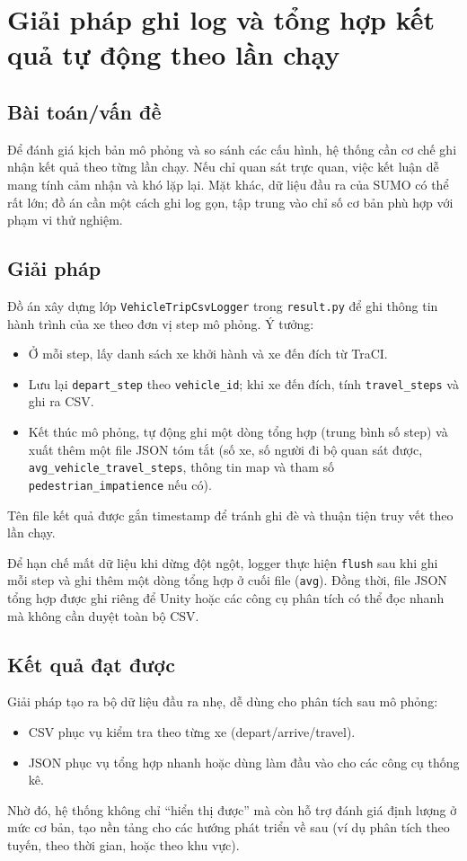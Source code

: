 \documentclass[../DoAn.tex]{subfiles}
\begin{document}
\section{Giải pháp ghi log và tổng hợp kết quả tự động theo lần chạy}
\subsection{Bài toán/vấn đề}
Để đánh giá kịch bản mô phỏng và so sánh các cấu hình, hệ thống cần cơ chế ghi nhận kết quả theo từng lần chạy. Nếu chỉ quan sát trực quan, việc kết luận dễ mang tính cảm nhận và khó lặp lại. Mặt khác, dữ liệu đầu ra của SUMO có thể rất lớn; đồ án cần một cách ghi log gọn, tập trung vào chỉ số cơ bản phù hợp với phạm vi thử nghiệm.

\subsection{Giải pháp}
Đồ án xây dựng lớp \texttt{VehicleTripCsvLogger} trong \texttt{result.py} để ghi thông tin hành trình của xe theo đơn vị step mô phỏng. Ý tưởng:
\begin{itemize}[leftmargin=2em]
	\item Ở mỗi step, lấy danh sách xe khởi hành và xe đến đích từ TraCI.
	\item Lưu lại \texttt{depart\_step} theo \texttt{vehicle\_id}; khi xe đến đích, tính \texttt{travel\_steps} và ghi ra CSV.
	\item Kết thúc mô phỏng, tự động ghi một dòng tổng hợp (trung bình số step) và xuất thêm một file JSON tóm tắt (số xe, số người đi bộ quan sát được, \texttt{avg\_vehicle\_travel\_steps}, thông tin map và tham số \texttt{pedestrian\_impatience} nếu có).
\end{itemize}
Tên file kết quả được gắn timestamp để tránh ghi đè và thuận tiện truy vết theo lần chạy.

Để hạn chế mất dữ liệu khi dừng đột ngột, logger thực hiện \texttt{flush} sau khi ghi mỗi step và ghi thêm một dòng tổng hợp ở cuối file (\texttt{avg}). Đồng thời, file JSON tổng hợp được ghi riêng để Unity hoặc các công cụ phân tích có thể đọc nhanh mà không cần duyệt toàn bộ CSV.

\subsection{Kết quả đạt được}
Giải pháp tạo ra bộ dữ liệu đầu ra nhẹ, dễ dùng cho phân tích sau mô phỏng:
\begin{itemize}[leftmargin=2em]
	\item CSV phục vụ kiểm tra theo từng xe (depart/arrive/travel).
	\item JSON phục vụ tổng hợp nhanh hoặc dùng làm đầu vào cho các công cụ thống kê.
\end{itemize}
Nhờ đó, hệ thống không chỉ ``hiển thị được'' mà còn hỗ trợ đánh giá định lượng ở mức cơ bản, tạo nền tảng cho các hướng phát triển về sau (ví dụ phân tích theo tuyến, theo thời gian, hoặc theo khu vực).
\end{document}

